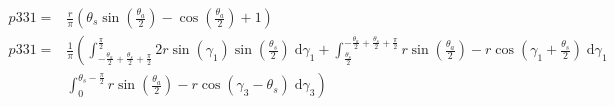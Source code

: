 \begin{align}
    p331 =& \frac{r}{\pi} \left(\theta_{s} \sin{\left (\frac{\theta_{a}}{2} \right )} - \cos{\left (\frac{\theta_{a}}{2} \right )} + 1\right)\\
    p331 =&\frac{1}{\pi} \left(\int_{- \frac{\theta_{a}}{2} + \frac{\theta_{s}}{2} + \frac{\pi}{2}}^{\frac{\pi}{2}}2 r \sin{\left (\gamma_{1} \right )} \sin{\left (\frac{\theta_{s}}{2} \right )}\;\mathrm{d}\gamma_{1}+\int_{\frac{\theta_{s}}{2}}^{- \frac{\theta_{a}}{2} + \frac{\theta_{s}}{2} + \frac{\pi}{2}}r \sin{\left (\frac{\theta_{a}}{2} \right )} - r \cos{\left (\gamma_{1} + \frac{\theta_{s}}{2} \right )}\;\mathrm{d}\gamma_{1} \right.\\
        &\left.  \int_{0}^{\theta_{s} - \frac{\pi}{2}}r \sin{\left (\frac{\theta_{a}}{2} \right )} - r \cos{\left (\gamma_{3} - \theta_{s} \right )}\;\mathrm{d}\gamma_{3}\right)
\end{align}
